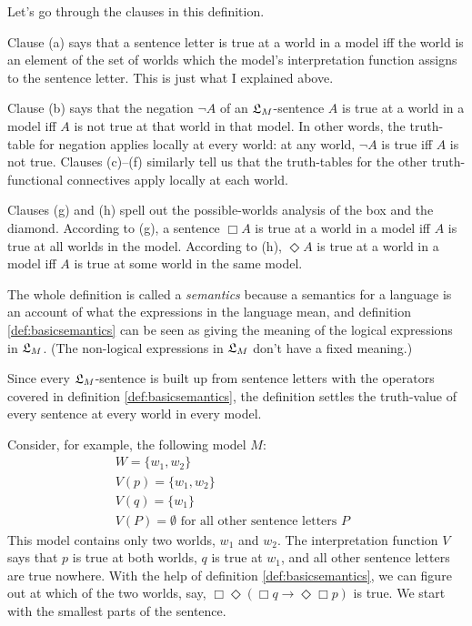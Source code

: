 Let's go through the clauses in this definition.

Clause (a) says that a sentence letter is true at a world in a model iff the
world is an element of the set of worlds which the model's interpretation
function assigns to the sentence letter. This is just what I explained above.

Clause (b) says that the negation $\neg A$ of an $\mathfrak{L}_M$-sentence $A$ is true at
a world in a model iff $A$ is not true at that world in that model. In other
words, the truth-table for negation applies locally at every world: at any
world, $\neg A$ is true iff $A$ is not true.
Clauses (c)--(f) similarly tell us that the truth-tables for the other
truth-functional connectives apply locally at each world.

Clauses (g) and (h) spell out the possible-worlds analysis of the box and the
diamond. According to (g), a sentence $\Box A$ is true at a world in a model iff
$A$ is true at all worlds in the model. According to (h), $\Diamond A$ is true
at a world in a model iff $A$ is true at some world in the same model.

The whole definition is called a \emph{semantics} because a semantics for a
language is an account of what the expressions in the language mean, and
definition \ref{def:basicsemantics} can be seen as giving the meaning of the
logical expressions in $\mathfrak{L}_M$. (The non-logical expressions in $\mathfrak{L}_{M}$ don't
have a fixed meaning.)

Since every $\mathfrak{L}_M$-sentence is built up from sentence letters with the operators
covered in definition \ref{def:basicsemantics}, the definition settles the
truth-value of every sentence at every world in every model.

Consider, for example, the following model $M$:
%
\begin{gather*}
  W = \{ w_{1},w_{2} \}\\
  V(p) = \{ w_{1},w_{2} \}\\
  V(q) = \{ w_{1} \}\\
  V(P) = \emptyset \text{ for all other sentence letters $P$ }
\end{gather*}
This model contains only two worlds, $w_{1}$ and $w_{2}$. The interpretation
function $V$ says that $p$ is true at both worlds, $q$ is true at $w_{1}$,
and all other sentence letters are true nowhere. With the help of definition
\ref{def:basicsemantics}, we can figure out at which of the two worlds, say,
$\Box\Diamond(\Box q \to \Diamond\Box p)$ is true. We start with the smallest
parts of the sentence.

